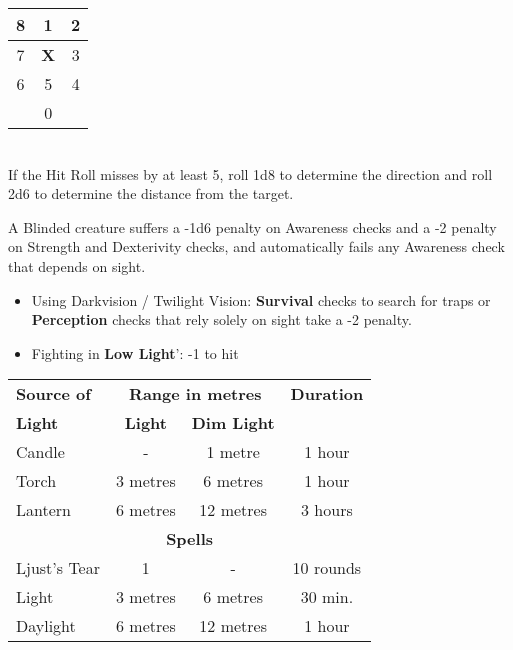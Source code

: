 \documentclass[landscape,10pt,a4paper]{article}
\begin{document}
\begin{multicols}{3}
\begin{dmbox}[title=Scatter Ranged Weapons - page \pageref{attackswithscatterweapons}]
\noindent\begin{tabular}{c|c|c}
8 &1 &2\\
\hline
7 &\textbf{X}& 3\\
\hline
6 &5& 4\\
\hline
&0&\\
\end{tabular}\\

If the Hit Roll misses by at least 5, roll 1d8 to determine the direction and roll 2d6 to determine the distance from the target.
\end{dmbox}

\begin{dmbox}[title=Vision - page \pageref{visionandlight}]

A Blinded creature suffers a -1d6 penalty on Awareness checks and a -2 penalty on Strength and Dexterivity checks, and automatically fails any Awareness check that depends on sight.

\begin{itemize}[leftmargin=0.5cm,itemsep=-1pt,parsep=0pt]
\item Using Darkvision / Twilight Vision: \textbf{Survival} checks to search for traps or \textbf{Perception} checks that rely solely on sight take a -2 penalty.
\item Fighting in \textbf{Low Light}': -1 to hit
\end{itemize}
\end{dmbox}

\begin{dmbox}[title=Light Sources - page \pageref{light sources}]

\noindent\begin{tabular}{l|cc|c}
\textbf{Source of} &\multicolumn{2}{c}{\textbf{Range in metres}}& \textbf{Duration} \\
\textbf{Light}& \textbf{Light} & \textbf{Dim Light} &\\
Candle & - & 1 metre & 1 hour\\
Torch & 3 metres & 6 metres & 1 hour\\
Lantern & 6 metres & 12 metres & 3 hours \\
\multicolumn{4}{c}{\textbf{Spells}}\\
Ljust's Tear & 1 & - & 10 rounds\\
Light & 3 metres & 6 metres &30 min. \\
Daylight & 6 metres & 12 metres & 1 hour
\end{tabular}
\end{dmbox}


\end{multicols}
\end{document}
